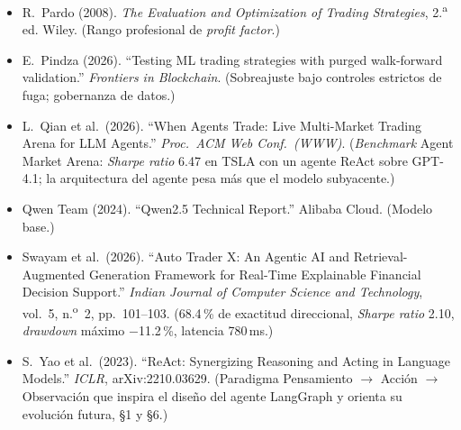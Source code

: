\documentclass[11pt]{article}
\begin{document}
{\begin{itemize}[leftmargin=1.4em]
\item R.~Pardo (2008). \textit{The Evaluation and Optimization of Trading Strategies}, 2.\textsuperscript{a} ed. Wiley. (Rango profesional de \textit{profit factor}.)
\item E.~Pindza (2026). ``Testing ML trading strategies with purged walk-forward validation.'' \textit{Frontiers in Blockchain}. (Sobreajuste bajo controles estrictos de fuga; gobernanza de datos.)
\item L.~Qian et al.\ (2026). ``When Agents Trade: Live Multi-Market Trading Arena for LLM Agents.'' \textit{Proc.\ ACM Web Conf.\ (WWW)}. (\textit{Benchmark} Agent Market Arena: \textit{Sharpe ratio} 6.47 en TSLA con un agente ReAct sobre GPT-4.1; la arquitectura del agente pesa m\'as que el modelo subyacente.)
\item Qwen Team (2024). ``Qwen2.5 Technical Report.'' Alibaba Cloud. (Modelo base.)
\item Swayam et al.\ (2026). ``Auto Trader X: An Agentic AI and Retrieval-Augmented Generation Framework for Real-Time Explainable Financial Decision Support.'' \textit{Indian Journal of Computer Science and Technology}, vol.~5, n.\textsuperscript{o}~2, pp.~101--103. (68.4\,\% de exactitud direccional, \textit{Sharpe ratio} 2.10, \textit{drawdown} m\'aximo $-$11.2\,\%, latencia 780\,ms.)
\item S.~Yao et al.\ (2023). ``ReAct: Synergizing Reasoning and Acting in Language Models.'' \textit{ICLR}, arXiv:2210.03629. (Paradigma Pensamiento $\rightarrow$ Acci\'on $\rightarrow$ Observaci\'on que inspira el dise\~no del agente LangGraph y orienta su evoluci\'on futura, \S1 y \S6.)
\end{itemize}}
\end{document}
